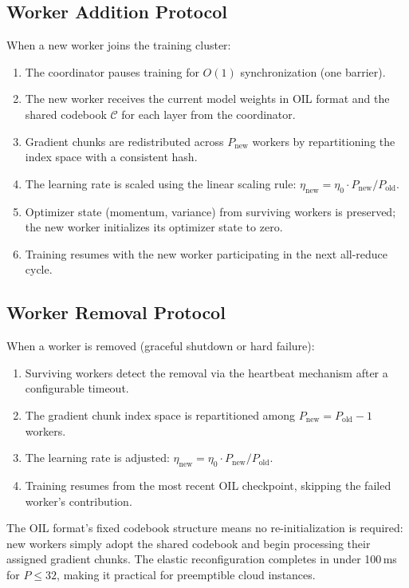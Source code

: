 \subsection{Worker Addition Protocol}

When a new worker joins the training cluster:
\begin{enumerate}
    \item The coordinator pauses training for $O(1)$ synchronization (one barrier).
    \item The new worker receives the current model weights in OIL format and the shared codebook $\mathcal{C}$ for each layer from the coordinator.
    \item Gradient chunks are redistributed across $P_{\text{new}}$ workers by repartitioning the index space with a consistent hash.
    \item The learning rate is scaled using the linear scaling rule: $\eta_{\text{new}} = \eta_0 \cdot P_{\text{new}} / P_{\text{old}}$.
    \item Optimizer state (momentum, variance) from surviving workers is preserved; the new worker initializes its optimizer state to zero.
    \item Training resumes with the new worker participating in the next all-reduce cycle.
\end{enumerate}

\subsection{Worker Removal Protocol}

When a worker is removed (graceful shutdown or hard failure):
\begin{enumerate}
    \item Surviving workers detect the removal via the heartbeat mechanism after a configurable timeout.
    \item The gradient chunk index space is repartitioned among $P_{\text{new}} = P_{\text{old}} - 1$ workers.
    \item The learning rate is adjusted: $\eta_{\text{new}} = \eta_0 \cdot P_{\text{new}} / P_{\text{old}}$.
    \item Training resumes from the most recent OIL checkpoint, skipping the failed worker's contribution.
\end{enumerate}

The OIL format's fixed codebook structure means no re-initialization is required: new workers simply adopt the shared codebook and begin processing their assigned gradient chunks. The elastic reconfiguration completes in under 100\,ms for $P \leq 32$, making it practical for preemptible cloud instances.

